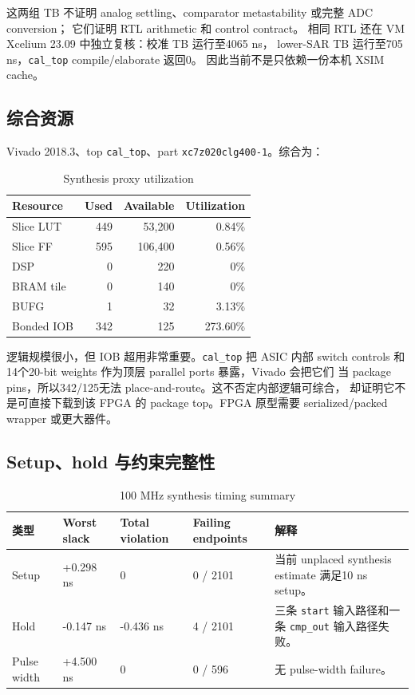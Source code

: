 \documentclass[UTF8,11pt,a4paper]{ctexart}
\newcommand{\code}[1]{\texttt{\small #1}}
\newcommand{\tablehead}{\rowcolor{PaleBlue}\bfseries\sffamily\color{DeepNavy}}
\begin{document}
这两组 TB 不证明 analog settling、comparator metastability 或完整 ADC conversion；
它们证明 RTL arithmetic 和 control contract。
相同 RTL 还在 VM Xcelium 23.09 中独立复核：校准 TB 运行至4065 ns，
lower-SAR TB 运行至705 ns，\code{cal\_top} compile/elaborate 返回0。
因此当前不是只依赖一份本机 XSIM cache。

\subsection{综合资源}

Vivado 2018.3、top \code{cal\_top}、part
\code{xc7z020clg400-1}。综合为：

\begin{table}[htbp]
  \centering
  \caption{Synthesis proxy utilization}
  \begin{tabular}{@{}lrrr@{}}
    \toprule
    \tablehead Resource & Used & Available & Utilization\\
    \midrule
    Slice LUT & 449 & 53,200 & 0.84\%\\
    Slice FF & 595 & 106,400 & 0.56\%\\
    DSP & 0 & 220 & 0\%\\
    BRAM tile & 0 & 140 & 0\%\\
    BUFG & 1 & 32 & 3.13\%\\
    Bonded IOB & 342 & 125 & 273.60\%\\
    \bottomrule
  \end{tabular}
\end{table}

逻辑规模很小，但 IOB 超用非常重要。\code{cal\_top} 把 ASIC 内部 switch
controls 和14个20-bit weights 作为顶层 parallel ports 暴露，Vivado 会把它们
当 package pins，所以342/125无法 place-and-route。这不否定内部逻辑可综合，
却证明它不是可直接下载到该 FPGA 的 package top。FPGA 原型需要
serialized/packed wrapper 或更大器件。

\subsection{Setup、hold 与约束完整性}

\begin{table}[htbp]
  \centering
  \caption{100 MHz synthesis timing summary}
  \begin{tabularx}{\textwidth}{@{}p{30mm}R{22mm}R{22mm}R{30mm}Y@{}}
    \toprule
    \tablehead 类型 & Worst slack & Total violation & Failing endpoints & 解释\\
    \midrule
    Setup & +0.298 ns & 0 & 0 / 2101 &
      当前 unplaced synthesis estimate 满足10 ns setup。\\
    Hold & -0.147 ns & -0.436 ns & 4 / 2101 &
      三条 \code{start} 输入路径和一条 \code{cmp\_out} 输入路径失败。\\
    Pulse width & +4.500 ns & 0 & 0 / 596 &
      无 pulse-width failure。\\
    \bottomrule
  \end{tabularx}
\end{table}
\end{document}
